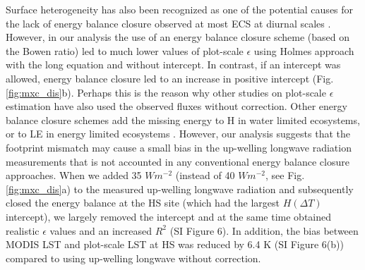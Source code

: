 \documentclass[fleqn,10pt]{wlscirep}
\begin{document}
Surface heterogeneity has also been recognized as one of the potential causes for the lack of energy balance closure observed at most ECS at diurnal scales \cite{wilson2002energy, stoy2013data}. However, in our analysis the use of an energy balance closure scheme (based on the Bowen ratio) led to much lower values of plot-scale $\epsilon$ using Holmes approach with the long equation and without intercept. In contrast, if an intercept was allowed, energy balance closure led to an increase in positive intercept (Fig. \ref{fig:mxc_dis}b). Perhaps this is the reason why other studies on plot-scale $\epsilon$ estimation have also used the observed fluxes without correction\cite{holmes2009land,holmes2016cloud,maes2019potential}. Other energy balance closure schemes add the missing energy to H in water limited ecosystems\cite{twine2000correcting}, or to LE in energy limited ecosystems \cite{chakraborty2019biases}. However, our analysis suggests that the footprint mismatch may cause a small bias in the up-welling longwave radiation measurements that is not accounted in any conventional energy balance closure approaches. When we added 35 $Wm^{-2}$ (instead of 40 $Wm^{-2}$, see Fig. \ref{fig:mxc_dis}a) to the measured up-welling longwave radiation and subsequently closed the energy balance at the HS site (which had the largest $H(\Delta T)$ intercept), we largely removed the intercept and at the same time obtained realistic $\epsilon$ values and an increased $R^2$ (SI Figure 6). In addition, the bias between MODIS LST and plot-scale LST at HS was reduced by 6.4 K (SI Figure 6(b)) compared to using up-welling longwave without correction. 
 
\end{document}
